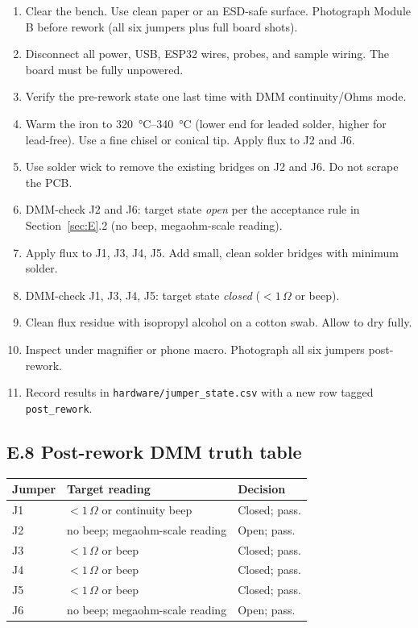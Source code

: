 \documentclass[11pt,a4paper]{article}
\newcommand{\Rohm}[1]{\ensuremath{#1\,\Omega}}
\begin{document}
\begin{enumerate}
\item Clear the bench. Use clean paper or an ESD-safe surface. Photograph Module B before rework (all six jumpers plus full board shots).
\item Disconnect all power, USB, ESP32 wires, probes, and sample wiring. The board must be fully unpowered.
\item Verify the pre-rework state one last time with DMM continuity/Ohms mode.
\item Warm the iron to \SIrange{320}{340}{\celsius} (lower end for leaded solder, higher for lead-free). Use a fine chisel or conical tip. Apply flux to J2 and J6.
\item Use solder wick to remove the existing bridges on J2 and J6. Do not scrape the PCB.
\item DMM-check J2 and J6: target state \emph{open} per the acceptance rule in Section~\ref{sec:E}.2 (no beep, megaohm-scale reading).
\item Apply flux to J1, J3, J4, J5. Add small, clean solder bridges with minimum solder.
\item DMM-check J1, J3, J4, J5: target state \emph{closed} ($<\Rohm{1}$ or beep).
\item Clean flux residue with isopropyl alcohol on a cotton swab. Allow to dry fully.
\item Inspect under magnifier or phone macro. Photograph all six jumpers post-rework.
\item Record results in \texttt{hardware/jumper\_state.csv} with a new row tagged \texttt{post\_rework}.
\end{enumerate}

\subsection{E.8 Post-rework DMM truth table}

\begin{xltabular}{\textwidth}{L{25mm}L{55mm}Y}
\toprule
\textbf{Jumper} & \textbf{Target reading} & \textbf{Decision}\\
\midrule
J1 & $<\Rohm{1}$ or continuity beep & Closed; pass.\\
J2 & no beep; megaohm-scale reading & Open; pass.\\
J3 & $<\Rohm{1}$ or beep & Closed; pass.\\
J4 & $<\Rohm{1}$ or beep & Closed; pass.\\
J5 & $<\Rohm{1}$ or beep & Closed; pass.\\
J6 & no beep; megaohm-scale reading & Open; pass.\\
\bottomrule
\end{xltabular}
\end{document}
